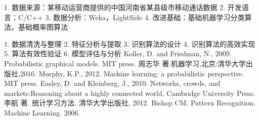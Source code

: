 \assignReq
{1. 数据来源：某移动运营商提供的中国河南省某县级市移动通话数据}
{2. 开发语言：C/C++}
{3. 数据分析：Weka，LightSide}
{4. 改进基础：基础机器学习分类算法，基础概率图算法}

\assignWork
{1. 数据清洗与整理}
{2. 特征分析与提取}
{3. 识别算法的设计}
{4. 识别算法的高效实现}
{5. 算法有效性验证}
{6. 模型评估与分析}
\assignRef
{Koller, D. and Friedman, N., 2009. Probabilistic graphical models. MIT press.}
{周志华 著.机器学习,北京:清华大学出版社,2016. }
{Murphy, K.P., 2012. Machine learning: a probabilistic perspective. MIT press.}
{Easley, D. and Kleinberg, J., 2010. Networks, crowds, and markets:Reasoning} 
{about a highly connected world. Cambridge University Press.}
{李航 著. 统计学习方法. 清华大学出版社, 2012.}
{Bishop CM. Pattern Recognition. Machine Learning. 2006.}

